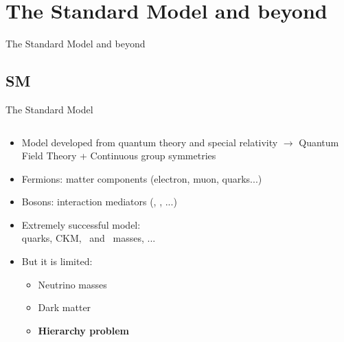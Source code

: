 \section[SM]{The Standard Model and beyond}
\setcounter{tocdepth}{2}

\begin{frame}
\begin{center}
The Standard Model and beyond
\end{center}
\end{frame}

\subsection{SM}
\begin{frame}{The Standard Model}
\vspace{-.2cm}
\begin{columns}

\begin{column}{.50\textwidth}
\begin{block}{}
\begin{itemize}\scriptsize
\item Model developed from quantum theory and special relativity $\to$ Quantum Field Theory + Continuous group symmetries
\item Fermions: matter components (electron, muon, quarks...)
\item Bosons: interaction mediators (\W, \Z, ...)
\item Extremely successful model: \\ quarks, CKM, \W~and \Z~masses, ...
\item But it is limited:
  \begin{itemize}\scriptsize
  \item Neutrino masses
  \item Dark matter
  \item \textbf{Hierarchy problem}
  \end{itemize}
\end{itemize}
\end{block}
\end{column}


\end{columns}
\end{frame}
